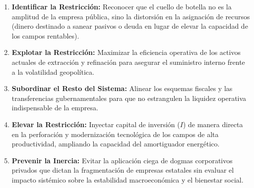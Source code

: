 \documentclass[12pt,letterpaper]{article}
\providecommand{\tightlist}{%
  \setlength{\itemsep}{0pt}\setlength{\parskip}{0pt}}
\begin{document}
\begin{enumerate}
\def\labelenumi{\arabic{enumi}.}
\tightlist
\item
  \textbf{Identificar la Restricción:} Reconocer que el cuello de
  botella no es la amplitud de la empresa pública, sino la distorsión en
  la asignación de recursos (dinero destinado a sanear pasivos o deuda
  en lugar de elevar la capacidad de los campos rentables).
\item
  \textbf{Explotar la Restricción:} Maximizar la eficiencia operativa de
  los activos actuales de extracción y refinación para asegurar el
  suministro interno frente a la volatilidad geopolítica.
\item
  \textbf{Subordinar el Resto del Sistema:} Alinear los esquemas
  fiscales y las transferencias gubernamentales para que no estrangulen
  la liquidez operativa indispensable de la empresa.
\item
  \textbf{Elevar la Restricción:} Inyectar capital de inversión (\(I\))
  de manera directa en la perforación y modernización tecnológica de los
  campos de alta productividad, ampliando la capacidad del amortiguador
  energético.
\item
  \textbf{Prevenir la Inercia:} Evitar la aplicación ciega de dogmas
  corporativos privados que dictan la fragmentación de empresas
  estatales sin evaluar el impacto sistémico sobre la estabilidad
  macroeconómica y el bienestar social.
\end{enumerate}
\end{document}
